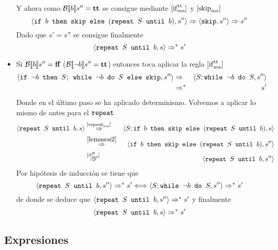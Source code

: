 \begin{example}
\begin{itemize}
\[    \]
    Y ahora como $\mathcal{B}[\![b]\!]s'' = \textbf{tt}$ se consigue mediante $[\mathrm{if}_{\mathrm{sos}}^{\mathrm{tt}}]$ y $[\mathrm{skip}_{\mathrm{sos}}]$
    \[
        \langle \texttt{if }b\texttt{ then skip else }(\texttt{repeat }S\texttt{ until }b), s'' \rangle \Rightarrow \langle \texttt{skip}, s'' \rangle \Rightarrow s''
    \]
    Dado que $s' = s''$ se consigue finalmente
    \[
         \langle \texttt{repeat }S\texttt{ until }b, s \rangle \Rightarrow^* s'
    \]
    \item Si $\mathcal{B}[\![b]\!]s'' = \textbf{ff}$ ($\mathcal{B}[\![\neg b]\!]s'' = \textbf{tt}$) entonces toca aplicar la regla $[\mathrm{if}_{\mathrm{sos}}^{\mathrm{tt}}]$
    \begin{eqnarray*}
        \langle \texttt{if }\neg b\texttt{ then } S;\texttt{ while }\neg b\texttt{ do }S\texttt{ else skip}, s'' \rangle &\Rightarrow& \langle S; \texttt{while }\neg b\texttt{ do }S, s'' \rangle \\
        &\Rightarrow^*& s'
    \end{eqnarray*}
    Donde en el último paso se ha aplicado determinismo.
    Volvemos a aplicar lo mismo de antes para el $\texttt{repeat}$
    \begin{eqnarray*}
        \langle \texttt{repeat }S\texttt{ until }b, s \rangle &\overset{[\mathrm{repeat}_{\mathrm{sos}}]}{\Rightarrow}& \langle S; \texttt{if }b\texttt{ then skip else }(\texttt{repeat }S\texttt{ until }b), s \rangle \\
        &\overset{\ref{lemasos2}}{\Rightarrow}& \langle \texttt{if }b\texttt{ then skip else }(\texttt{repeat }S\texttt{ until }b), s'' \rangle \\
        &\overset{[\mathrm{if}_{\mathrm{sos}}^{\mathrm{ff}}]}{\Rightarrow}& \langle \texttt{repeat }S\texttt{ until }b, s'' \rangle
    \end{eqnarray*}
    Por hipótesis de inducción se tiene que
    \[
        \langle \texttt{repeat }S\texttt{ until }b, s'' \rangle \Rightarrow^* s' \Longleftrightarrow \langle S; \texttt{while }\neg b\texttt{ do }S, s'' \rangle \Rightarrow^* s'
    \]
    de donde se deduce que $\langle \texttt{repeat }S\texttt{ until }b, s'' \rangle \Rightarrow^* s'$ y finalmente
    \[
         \langle \texttt{repeat }S\texttt{ until }b, s \rangle \Rightarrow^* s'
    \]
\end{itemize}
\end{example}
\subsection{Expresiones}

